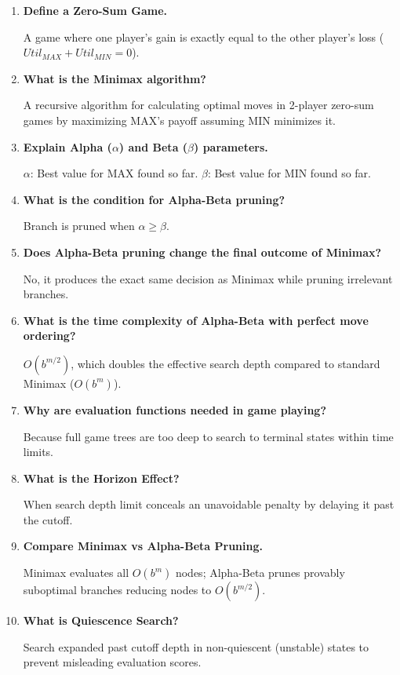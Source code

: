 \documentclass[12pt,a4paper]{article}
\newcommand{\Q}[1]{\textbf{#1}\par\noindent\ignorespaces}
\begin{document}
\begin{tcolorbox}[exambox, title={\textbf{Frequently Asked / Viva Questions}}]
  \begin{enumerate}[topsep=0pt, label=\textbf{Q\arabic*.}, itemsep=5pt]
    \item \Q{Define a Zero-Sum Game.}
    A game where one player's gain is exactly equal to the other player's loss ($Util_{MAX} + Util_{MIN} = 0$).

    \item \Q{What is the Minimax algorithm?}
    A recursive algorithm for calculating optimal moves in 2-player zero-sum games by maximizing MAX's payoff assuming MIN minimizes it.

    \item \Q{Explain Alpha ($\alpha$) and Beta ($\beta$) parameters.}
    $\alpha$: Best value for MAX found so far. $\beta$: Best value for MIN found so far.

    \item \Q{What is the condition for Alpha-Beta pruning?}
    Branch is pruned when $\alpha \ge \beta$.

    \item \Q{Does Alpha-Beta pruning change the final outcome of Minimax?}
    No, it produces the exact same decision as Minimax while pruning irrelevant branches.

    \item \Q{What is the time complexity of Alpha-Beta with perfect move ordering?}
    $O(b^{m/2})$, which doubles the effective search depth compared to standard Minimax ($O(b^m)$).

    \item \Q{Why are evaluation functions needed in game playing?}
    Because full game trees are too deep to search to terminal states within time limits.

    \item \Q{What is the Horizon Effect?}
    When search depth limit conceals an unavoidable penalty by delaying it past the cutoff.

    \item \Q{Compare Minimax vs Alpha-Beta Pruning.}
    Minimax evaluates all $O(b^m)$ nodes; Alpha-Beta prunes provably suboptimal branches reducing nodes to $O(b^{m/2})$.

    \item \Q{What is Quiescence Search?}
    Search expanded past cutoff depth in non-quiescent (unstable) states to prevent misleading evaluation scores.
  \end{enumerate}
\end{tcolorbox}
\end{document}
